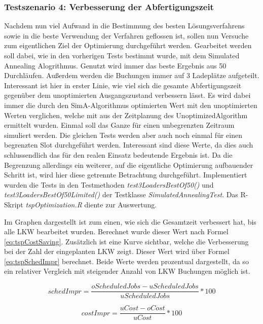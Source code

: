 \subsubsection{Testszenario 4: Verbesserung der Abfertigungszeit}

Nachdem nun viel Aufwand in die Bestimmung des besten Lösungsverfahrens sowie in die beste Verwendung der Verfahren geflossen ist, sollen nun Versuche zum eigentlichen Ziel der Optimierung durchgeführt werden. Gearbeitet werden soll dabei, wie in den vorherigen Tests bestimmt wurde, mit dem Simulated Annealing Alogrithmus. Genutzt wird immer das beste Ergebnis aus 50 Durchläufen. Außerdem werden die Buchungen immer auf 3 Ladeplätze aufgeteilt. Interessant ist hier in erster Linie, wie viel sich die gesamte Abfertigungszeit gegenüber dem unoptimierten Ausgangszustand verbessern lässt. Es wird dabei immer die durch den SimA-Algorithmus optimierten Wert mit den unoptimierten Werten verglichen, welche mit aus der Zeitplanung des UnoptimizedAlgorithm ermittelt wurden. Einmal soll das Ganze für einen unbegrenzten Zeitraum simuliert werden. Die gleichen Tests werden aber auch noch einmal für einen begrenzten Slot durchgeführt werden. Interessant sind diese Werte, da dies auch schlussendlich das für den realen Einsatz bedeutende Ergebnis ist. Da die Begrenzung allerdings ein weiterer, auf die eigentliche Optimierung aufbauender Schritt ist, wird hier diese getrennte Betrachtung durchgeführt. Implementiert wurden die Tests in den Testmethoden \textit{test3LoadersBestOf50()} und \textit{test3LoadersBestOf50Limited()} der Testklasse \textit{SimulatedAnnealingTest}. Das R-Skript \textit{tspOptimization.R} diente zur Auswertung.

Im Graphen dargestellt ist zum einen, wie sich die Gesamtzeit verbessert hat, bis alle LKW bearbeitet wurden. Berechnet wurde dieser Wert nach Formel \ref{eq:tspCostSaving}. Zusätzlich ist eine Kurve sichtbar, welche die Verbesserung bei der Zahl der eingeplanten LKW zeigt. Dieser Wert wird über Formel \ref{eq:tspSchedImpr} berechnet. Beide Werte werden prozentual dargestellt, da so ein relativer Vergleich mit steigender Anzahl von LKW Buchungen möglich ist.

\begin{equation} \label{eq:tspSchedImpr}
schedImpr = \dfrac{oScheduledJobs-uScheduledJobs}{uScheduledJobs} * 100
\end{equation}

\begin{equation} \label{eq:tspCostSaving}
costImpr = \dfrac{uCost-oCost}{uCost} * 100
\end{equation}

